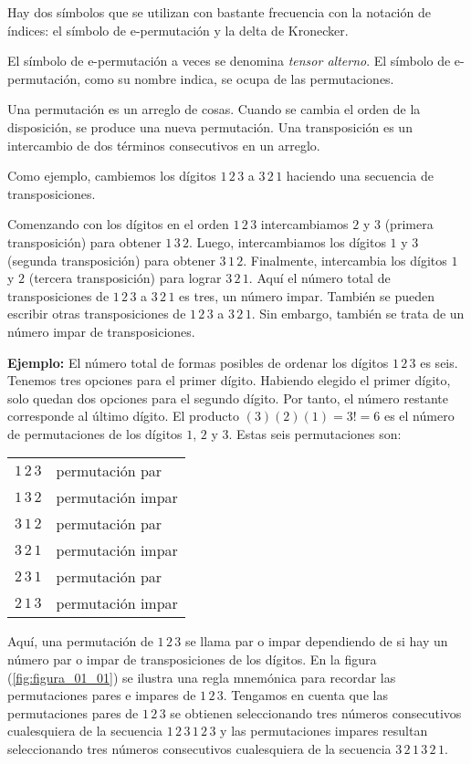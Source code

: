 Hay dos símbolos que se utilizan con bastante frecuencia con la notación de índices: el símbolo de e-permutación y la delta de Kronecker.
\par
El símbolo de e-permutación a veces se denomina \emph{tensor alterno}. El símbolo de e-permutación, como su nombre indica, se ocupa de las permutaciones.
\par
Una permutación es un arreglo de cosas. Cuando se cambia el orden de la disposición, se produce una nueva permutación. Una transposición es un intercambio de dos términos consecutivos en un arreglo.
\par
Como ejemplo, cambiemos los dígitos $1 \, 2 \, 3$ a $3 \, 2 \, 1$ haciendo una secuencia de transposiciones.
\par
Comenzando con los dígitos en el orden $1 \, 2 \, 3$ intercambiamos $2$ y $3$ (primera transposición) para obtener $1 \, 3 \, 2$. Luego, intercambiamos los dígitos $1$ y $3$ (segunda transposición) para obtener $3 \, 1 \, 2$. Finalmente, intercambia los dígitos $1$ y $2$ (tercera transposición) para lograr $3 \, 2 \, 1$. Aquí el número total de transposiciones de $1 \, 2 \, 3$ a $3 \, 2 \, 1$ es tres, un número impar. También se pueden escribir otras transposiciones de $1 \, 2 \, 3$ a $3 \, 2 \, 1$. Sin embargo, también se trata de un número impar de transposiciones.
\par
\noindent
\textbf{Ejemplo: } El número total de formas posibles de ordenar los dígitos $1 \, 2 \, 3$ es seis. Tenemos tres opciones para el primer dígito. Habiendo elegido el primer dígito, solo quedan dos opciones para el segundo dígito. Por tanto, el número restante corresponde al último dígito. El producto $(3) (2) (1) = 3! = 6$ es el número de permutaciones de los dígitos $1$, $2$ y $3$. Estas seis permutaciones son:
\begin{table}[H]
\large
\centering
\begin{tabular}{c l}
$1 \, 2 \, 3$ & permutación par   \\
$1 \, 3 \, 2$ & permutación impar \\
$3 \, 1 \, 2$ & permutación par   \\
$3 \, 2 \, 1$ & permutación impar \\
$2 \, 3 \, 1$ & permutación par   \\
$2 \, 1 \, 3$ & permutación impar \\
\end{tabular}
\end{table}
Aquí, una permutación de $1 \, 2 \, 3$ se llama par o impar dependiendo de si hay un número par o impar de transposiciones de los dígitos. En la figura (\ref{fig:figura_01_01}) se ilustra una regla mnemónica para recordar las permutaciones pares e impares de $1 \, 2 \, 3$. Tengamos en cuenta que las permutaciones pares de $1 \, 2 \, 3$ se obtienen seleccionando tres números consecutivos cualesquiera de la secuencia $1 \, 2 \, 3\, 1 \, 2 \, 3$ y las permutaciones impares resultan seleccionando tres números consecutivos cualesquiera de la secuencia $3 \, 2 \, 1 \, 3 \, 2 \, 1$.
